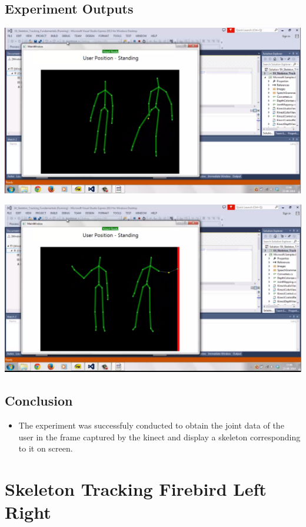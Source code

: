 \begin{flushleft}
\subsection{\textbf{ Experiment Outputs}}
\includegraphics[scale = 0.5]{e41}

\medskip
\includegraphics[scale = 0.5]{e42}

\medskip
\subsection{\textbf{ Conclusion}}
\begin{itemize}
\item The experiment was successfuly conducted to obtain the joint data of the user in the frame captured by the kinect and display a skeleton corresponding to it on screen.
\end{itemize}

\medskip
\newpage

\section{\textbf{ Skeleton Tracking Firebird Left Right}}
\label{4.5}


\end{flushleft}
